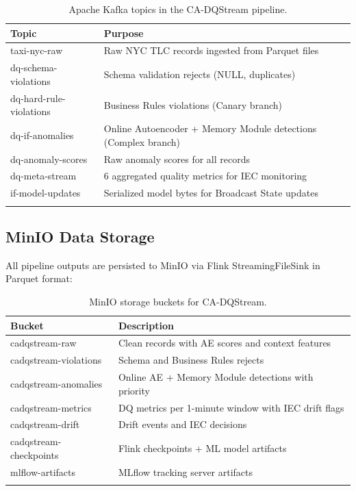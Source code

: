 \begin{longtable}{|m{4cm}|m{9cm}|}
\hline
\textbf{Topic} & \textbf{Purpose} \\ \hline
taxi-nyc-raw & Raw NYC TLC records ingested from Parquet files \\ \hline
dq-schema-violations & Schema validation rejects (NULL, duplicates) \\ \hline
dq-hard-rule-violations & Business Rules violations (Canary branch) \\ \hline
dq-if-anomalies & Online Autoencoder + Memory Module detections (Complex branch) \\ \hline
dq-anomaly-scores & Raw anomaly scores for all records \\ \hline
dq-meta-stream & 6 aggregated quality metrics for IEC monitoring \\ \hline
if-model-updates & Serialized model bytes for Broadcast State updates \\ \hline
\caption{Apache Kafka topics in the CA-DQStream pipeline.}
\label{tab:kafka_topics}
\end{longtable}

\subsection{MinIO Data Storage}

All pipeline outputs are persisted to MinIO via Flink StreamingFileSink in Parquet format:

\begin{longtable}{|m{4cm}|m{9.5cm}|}
\hline
\textbf{Bucket} & \textbf{Description} \\ \hline
cadqstream-raw & Clean records with AE scores and context features \\ \hline
cadqstream-violations & Schema and Business Rules rejects \\ \hline
cadqstream-anomalies & Online AE + Memory Module detections with priority \\ \hline
cadqstream-metrics & DQ metrics per 1-minute window with IEC drift flags \\ \hline
cadqstream-drift & Drift events and IEC decisions \\ \hline
cadqstream-checkpoints & Flink checkpoints + ML model artifacts \\ \hline
mlflow-artifacts & MLflow tracking server artifacts \\
\hline
\caption{MinIO storage buckets for CA-DQStream.}
\label{tab:minio_schema}
\end{longtable}

